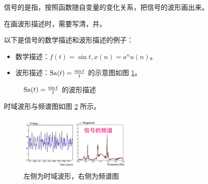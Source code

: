 \begin{definition}[波形描述]
    信号的是指，按照函数随自变量的变化关系，把信号的波形画出来。
\end{definition}

\begin{note}
    在画波形描述时，需要写清，并。
\end{note}

\begin{example}
    以下是信号的数学描述和波形描述的例子：
    \begin{itemize}
        \item 数学描述：$f(t) = \sin t, x(n) = a^nu(n)$。
        \item 波形描述：$\mathrm{Sa}(t) = \frac{\sin t}{t}$ 的示意图如图 \ref{fig:sa-t-wave-description}。
    \end{itemize}
    \begin{figure}[htbp]
        \centering
        \caption{$\mathrm{Sa}(t) = \frac{\sin t}{t}$ 的波形描述}
        \label{fig:sa-t-wave-description}
    \end{figure}
\end{example}

\begin{example}[时域波形与频谱图]
    时域波形与频谱图如图 \ref{fig:wave-spectrum} 所示。
    \begin{figure}[htbp]
        \centering
        \includegraphics[width=0.5\textwidth]{chap1/img/wave-spectrum.png}
        \caption{左侧为时域波形，右侧为频谱图}
        \label{fig:wave-spectrum}
    \end{figure}
\end{example}

